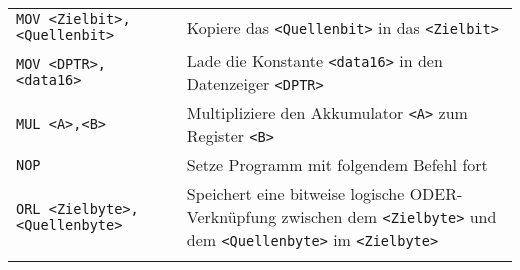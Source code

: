 \begin{longtable}[c]{@{}ll@{}}
\begin{minipage}[t]{0.25\columnwidth}\raggedright\strut
\texttt{MOV\ \textless{}Zielbit\textgreater{},}
\texttt{\textless{}Quellenbit\textgreater{}}
\strut\end{minipage} &
\begin{minipage}[t]{0.69\columnwidth}\raggedright\strut
Kopiere das \texttt{\textless{}Quellenbit\textgreater{}} in das
\texttt{\textless{}Zielbit\textgreater{}}
\strut\end{minipage}\tabularnewline
\begin{minipage}[t]{0.25\columnwidth}\raggedright\strut
\texttt{MOV\ \textless{}DPTR\textgreater{},\textless{}data16\textgreater{}}
\strut\end{minipage} &
\begin{minipage}[t]{0.69\columnwidth}\raggedright\strut
Lade die Konstante \texttt{\textless{}data16\textgreater{}} in den
Datenzeiger \texttt{\textless{}DPTR\textgreater{}}
\strut\end{minipage}\tabularnewline
\begin{minipage}[t]{0.25\columnwidth}\raggedright\strut
\texttt{MUL\ \textless{}A\textgreater{},\textless{}B\textgreater{}}
\strut\end{minipage} &
\begin{minipage}[t]{0.69\columnwidth}\raggedright\strut
Multipliziere den Akkumulator \texttt{\textless{}A\textgreater{}} zum
Register \texttt{\textless{}B\textgreater{}}
\strut\end{minipage}\tabularnewline
\begin{minipage}[t]{0.25\columnwidth}\raggedright\strut
\texttt{NOP}
\strut\end{minipage} &
\begin{minipage}[t]{0.69\columnwidth}\raggedright\strut
Setze Programm mit folgendem Befehl fort
\strut\end{minipage}\tabularnewline
\begin{minipage}[t]{0.25\columnwidth}\raggedright\strut
\texttt{ORL\ \textless{}Zielbyte\textgreater{},}
\texttt{\textless{}Quellenbyte\textgreater{}}
\strut\end{minipage} &
\begin{minipage}[t]{0.69\columnwidth}\raggedright\strut
Speichert eine bitweise logische ODER-Verknüpfung zwischen dem
\texttt{\textless{}Zielbyte\textgreater{}} und dem
\texttt{\textless{}Quellenbyte\textgreater{}} im
\texttt{\textless{}Zielbyte\textgreater{}}
\strut\end{minipage}\tabularnewline
\begin{minipage}[t]{0.25\columnwidth}\raggedright\strut

\end{minipage}
\end{longtable}
